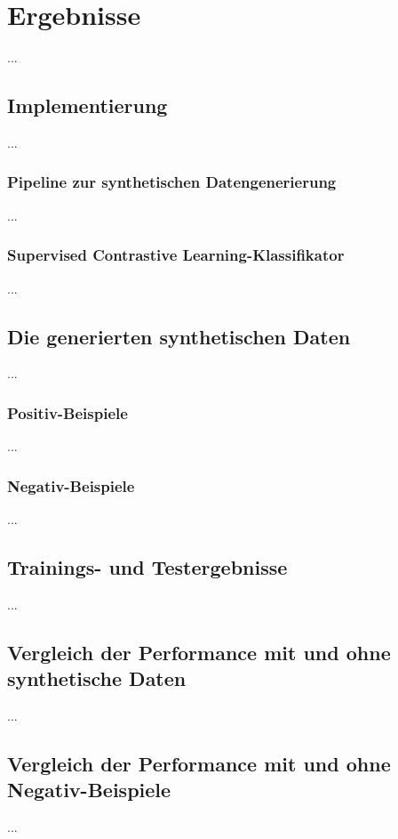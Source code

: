 \chapter{Ergebnisse}

...

\section{Implementierung}

...

\subsection{Pipeline zur synthetischen Datengenerierung}

...

\subsection{Supervised Contrastive Learning-Klassifikator}

...

\section{Die generierten synthetischen Daten}

...

\subsection{Positiv-Beispiele}

...

\subsection{Negativ-Beispiele}

...

\section{Trainings- und Testergebnisse}

...

\section{Vergleich der Performance mit und ohne synthetische Daten}

...

\section{Vergleich der Performance mit und ohne Negativ-Beispiele}

...